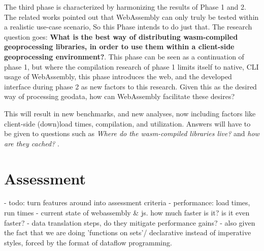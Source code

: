 

The third phase is characterized by harmonizing the results of Phase 1 and 2. 
The related works pointed out that WebAssembly can only truly be tested within a realistic use-case scenario, So this Phase intends to do just that.
The research question goes: \textbf{What is the best way of distributing wasm-compiled geoprocessing libraries, in order to use them within a client-side geoprocessing environment?}. 
This phase can be seen as a continuation of phase 1, but where the compilation research of phase 1 limits itself to native, CLI usage of WebAssembly, this phase introduces the web, and the developed interface during phase 2 as new factors to this research. Given this as the desired way of processing geodata, how can WebAssembly facilitate these desires? 

This will result in new benchmarks, and new analyses, now including factors like client-side (down)load times, compilation, and utilization. Answers will have to be given to questions such as \textit{Where do the wasm-compiled libraries live?} and \textit{ how are they cached? }.



\section{Assessment}
\label{sec:method-four}
\mySubRQFour

\begin{note}
  - todo: turn features around into assessment criteria
  - performance: load times, run times
  - current state of webassembly & js. how much faster is it? is it even faster? 
     - data translation steps, do they mitigate performance gains? 
     - also given the fact that we are doing 'functions on sets'/ declarative instead of imperative styles, forced by the format of dataflow programming. 

\end{note}

